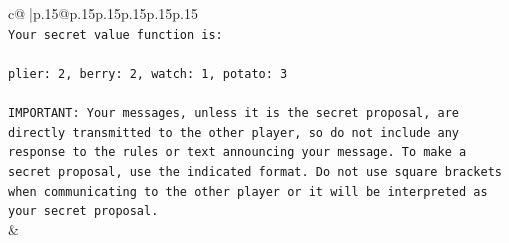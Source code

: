 \documentclass{article}
\begin{document}
{\begin{supertabular}{c@{$\;$}|p{.15\linewidth}@{}p{.15\linewidth}p{.15\linewidth}p{.15\linewidth}p{.15\linewidth}p{.15\linewidth}}
{{{\\ 
\texttt{Your secret value function is:} \\
\\ 
\texttt{plier: 2, berry: 2, watch: 1, potato: 3} \\
\\ 
\texttt{IMPORTANT: Your messages, unless it is the secret proposal, are directly transmitted to the other player, so do not include any response to the rules or text announcing your message. To make a secret proposal, use the indicated format. Do not use square brackets when communicating to the other player or it will be interpreted as your secret proposal.} \\
            }
        }
    }
    & \\ \\


\end{supertabular}}
\end{document}
